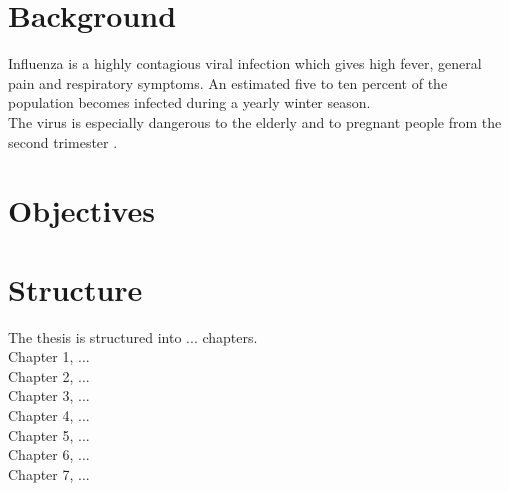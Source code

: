 \section{Background}
Influenza is a highly contagious viral infection which gives high fever, general pain and respiratory symptoms. An estimated five to ten percent of the population becomes infected during a yearly winter season.\\ The virus is especially dangerous to the elderly and to pregnant people from the second trimester \cite{fhi_sykdommer}.


\section{Objectives}

\section{Structure}
The thesis is structured into ... chapters.\\
Chapter 1, ...\\
Chapter 2, ...\\
Chapter 3, ...\\
Chapter 4, ...\\
Chapter 5, ...\\
Chapter 6, ...\\
Chapter 7, ...\\